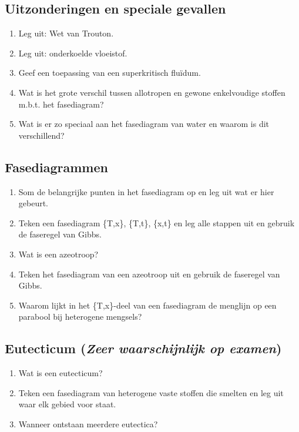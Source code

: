 \documentclass[a4paper,12pt]{article}
\begin{document}
    \subsection{Uitzonderingen en speciale gevallen}
    \begin{enumerate}
        \item Leg uit: Wet van Trouton.
        \item Leg uit: onderkoelde vloeistof.
        \item Geef een toepassing van een superkritisch flu\"idum.
        \item Wat is het grote verschil tussen allotropen en gewone enkelvoudige stoffen m.b.t. het fasediagram?
        \item Wat is er zo speciaal aan het fasediagram van water en waarom is dit verschillend?
    \end{enumerate}

    \subsection{Fasediagrammen}
    \begin{enumerate}
        \item Som de belangrijke punten in het fasediagram op en leg uit wat er hier gebeurt.
        \item Teken een fasediagram \{T,x\}, \{T,t\}, \{x,t\} en leg alle stappen uit en gebruik de faseregel van Gibbs.
        \item Wat is een azeotroop?
        \item Teken het fasediagram van een azeotroop uit en gebruik de faseregel van Gibbs.
        \item Waarom lijkt in het \{T,x\}-deel van een fasediagram de menglijn op een parabool bij heterogene mengsels?
    \end{enumerate}

    \subsection{Eutecticum (\emph{Zeer waarschijnlijk op examen})}
    \begin{enumerate}
        \item Wat is een eutecticum?
        \item Teken een fasediagram van heterogene vaste stoffen die smelten en leg uit waar elk gebied voor staat.
        \item Wanneer ontstaan meerdere eutectica?
    \end{enumerate}
\end{document}
